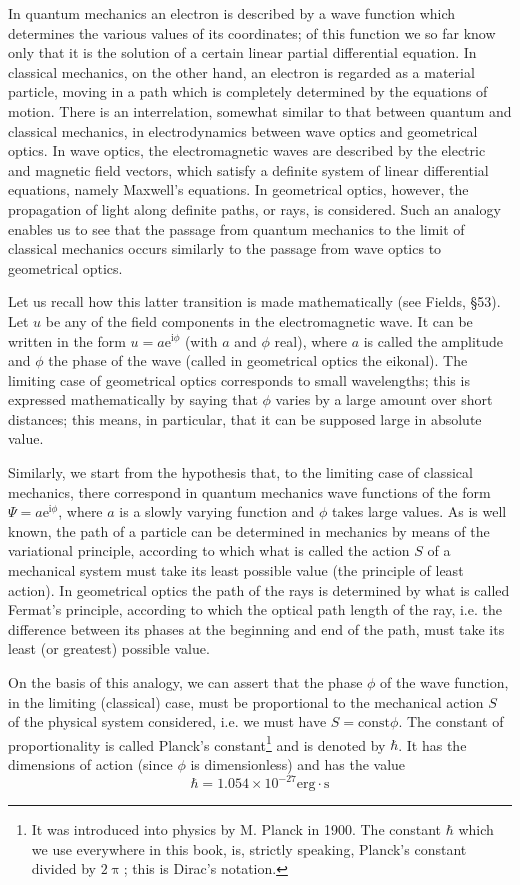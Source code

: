 In quantum mechanics an electron is described by a wave function which determines the various values of its coordinates; of this function we so far know only that it is the solution of a certain linear partial differential equation. In classical mechanics, on the other hand, an electron is regarded as a material particle, moving in a path which is completely determined by the equations of motion. There is an interrelation, somewhat similar to that between quantum and classical mechanics, in electrodynamics between wave optics and geometrical optics. In wave optics, the electromagnetic waves are described by the electric and magnetic field vectors, which satisfy a definite system of linear differential equations, namely Maxwell’s equations. In geometrical optics, however, the propagation of light along definite paths, or rays, is considered. Such an analogy enables us to see that the passage from quantum mechanics to the limit of classical mechanics occurs similarly to the passage from wave optics to geometrical optics.
	
Let us recall how this latter transition is made mathematically (see Fields, §53). Let $ u $ be any of the field components in the electromagnetic wave. It can be written in the form $ u = a\mathrm{e}^{\mathrm{i}\phi} $ (with $ a $ and $ \phi $ real), where $ a $ is called the amplitude and $ \phi $ the phase of the wave (called in geometrical optics the eikonal). The limiting case of geometrical optics corresponds to small wavelengths; this is expressed mathematically by saying that $ \phi $ varies by a large amount over short distances; this means, in particular, that it can be supposed large in absolute value.
	
Similarly, we start from the hypothesis that, to the limiting case of classical mechanics, there correspond in quantum mechanics wave functions of the form$  \Psi = a\mathrm{e}^{\mathrm{i}\phi} $, where $ a $ is a slowly varying function and $ \phi $ takes large values. As is well known, the path of a particle can be determined in mechanics by means of the variational principle, according to which what is called the action $ S $ of a mechanical system must take its least possible value (the principle of least action). In geometrical optics the path of the rays is determined by what is called Fermat’s principle, according to which the optical path length of the ray, i.e. the difference between its phases at the beginning and end of the path, must take its least (or greatest) possible value.
	
On the basis of this analogy, we can assert that the phase $ \phi $ of the wave function, in the limiting (classical) case, must be proportional to the mechanical action $ S $ of the physical system considered, i.e. we must have $ S = \mathrm{const}\phi $. The constant of proportionality is called Planck’s constant\footnote{It was introduced into physics by M. Planck in 1900. The constant $ \hbar $ which we use everywhere in this book, is, strictly speaking, Planck’s constant divided by $ 2\uppi $; this is Dirac’s notation.
} and is denoted by $ \hbar $. It has the dimensions of action (since $ \phi $ is dimensionless) and has the value
\[ \hbar=1.054\times10^{-27}\mathrm{erg}\cdot\mathrm{s} \]	
	
